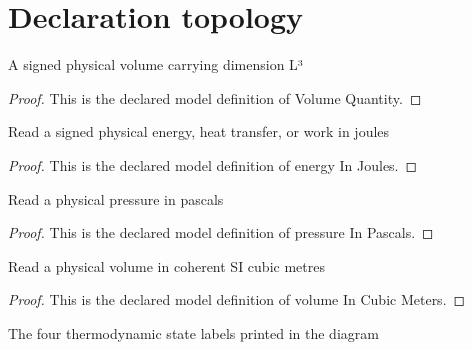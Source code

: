 \section{Declaration topology}
\begin{definition}
  \label{def:physics:phyx-mini-0494:phyxminiproblems-problemphyxmini0494-volumequantity}
  A signed physical volume carrying dimension L³
\end{definition}
\begin{proof}
  This is the declared model definition of Volume Quantity.
\end{proof}
\begin{definition}
  \label{def:physics:phyx-mini-0494:phyxminiproblems-problemphyxmini0494-energyinjoules}
  Read a signed physical energy, heat transfer, or work in joules
\end{definition}
\begin{proof}
  This is the declared model definition of energy In Joules.
\end{proof}
\begin{definition}
  \label{def:physics:phyx-mini-0494:phyxminiproblems-problemphyxmini0494-pressureinpascals}
  Read a physical pressure in pascals
\end{definition}
\begin{proof}
  This is the declared model definition of pressure In Pascals.
\end{proof}
\begin{definition}
  \label{def:physics:phyx-mini-0494:phyxminiproblems-problemphyxmini0494-volumeincubicmeters}
  Read a physical volume in coherent SI cubic metres
\end{definition}
\begin{proof}
  This is the declared model definition of volume In Cubic Meters.
\end{proof}
\begin{definition}
  \label{def:physics:phyx-mini-0494:phyxminiproblems-problemphyxmini0494-statelabel}
  The four thermodynamic state labels printed in the diagram
\end{definition}
